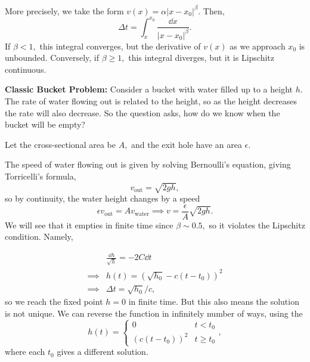 \documentclass{article}
\numberwithin{equation}{section}
\begin{document}
More precisely, we take the form $v(x) = \alpha |x-x_0|^\beta.$ Then,
\begin{equation*}
    \Delta t = \int_{x}^{x_0} \frac{\dd{x}}{|x-x_0|^\beta}.
\end{equation*}
If $\beta < 1,$ this integral converges, but the derivative of $v(x)$ as we approach $x_0$ is unbounded. Conversely, if $\beta \ge 1,$ this integral diverges, but it is Lipschitz continuous.
\begin{example}
    \textbf{Classic Bucket Problem:} Consider a bucket with water filled up to a height $h.$ The rate of water flowing out is related to the height, so as the height decreases the rate will also decrease. So the question asks, how do we know when the bucket will be empty?
    \begin{center}
    \end{center}
    Let the cross-sectional area be $A,$ and the exit hole have an area $\epsilon.$

    The speed of water flowing out is given by solving Bernoulli's equation, giving Torricelli's formula,
    \begin{equation*}
        v_\text{out} = \sqrt{2gh},
    \end{equation*}
    so by continuity, the water height changes by a speed 
    \begin{equation*}
        \epsilon v_\text{out} = Av_\text{water} \implies v = \frac{\epsilon}{A}\sqrt{2gh}.
    \end{equation*}
    We will see that it empties in finite time since $\beta \sim 0.5,$ so it violates the Lipschitz condition. Namely,

    \begin{align*}
        &\frac{\dd{h}}{\sqrt{h}} = - 2 C \dd{t} \\ 
        \implies &h(t) = \left(\sqrt{h_0} - c(t-t_0)\right)^2 \\ 
        \implies & \Delta t = \sqrt{h_0}/c,
    \end{align*}
    so we reach the fixed point $h=0$ in finite time. But this also means the solution is not unique. We can reverse the function in infinitely number of ways, using the 
    \begin{equation*}
        h(t) = \begin{cases}
            0 & t < t_0 \\ 
            (c(t-t_0))^2 & t \ge t_0
        \end{cases},
    \end{equation*}
    where each $t_0$ gives a different solution.
\end{example}
\end{document}
